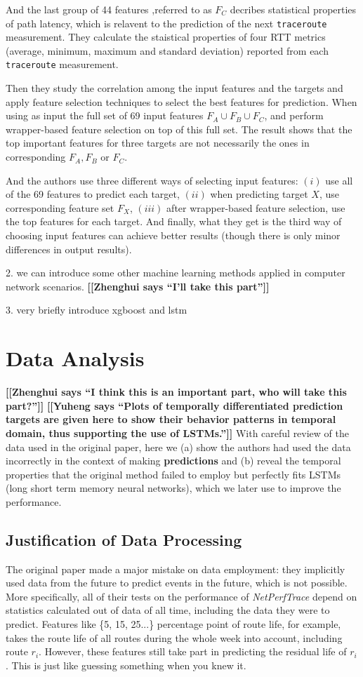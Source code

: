 \documentclass[sigconf]{acmart}
\newcommand{\heng}[1]{{\bf \color{cyan} [[Yuheng says ``#1'']]}}
\newcommand{\hui}[1]{{\bf \color{purple} [[Zhenghui says ``#1'']]}}
\begin{document}
And the last group of 44 features ,referred to as $F_C$ decribes statistical properties of path latency, which is relavent to the prediction of the next \texttt{traceroute} measurement. They calculate the staistical properties of four RTT metrics (average, minimum, maximum and standard deviation) reported from each \texttt{traceroute} measurement.
 

Then they study the correlation among the input features and the targets and apply  feature selection techniques to select the best features for prediction. When using as input the full set of 69 input features $F_A \cup F_B \cup F_C$, and perform wrapper-based feature selection on top of this full set. The result shows that the top important features for three targets are not necessarily the ones in corresponding $F_A,F_B$ or $F_C$.
 

And the authors use three different ways of selecting input features: $(i)$  use all of the 69 features to predict each target, $(ii)$ when predicting target $X$, use corresponding feature set $F_X$, $(iii)$ after wrapper-based feature selection, use the top features for each target. And finally, what they get is the third way of choosing input features can achieve better results (though there is only minor differences in output results).
 

2. we can introduce some other machine learning methods applied in computer network scenarios. \hui{I'll take this part}
 


3. very briefly introduce xgboost and lstm
 

\section{Data Analysis}
\hui{I think this is an important part, who will take this part?}
\heng{Plots of temporally differentiated prediction targets are given here to show their behavior patterns in temporal domain, thus supporting the use of LSTMs.}
With careful review of the data used in the original paper, here we (a) show the authors had used the data incorrectly in the context of making \textbf{predictions} and (b) reveal the temporal properties that the original method failed to employ but perfectly fits LSTMs (long short term memory neural networks), which we later use to improve the performance.

\subsection{Justification of Data Processing}
The original paper \cite{predict} made a major mistake on data employment: they implicitly used data from the future to predict events in the future, which is not possible. More specifically, all of their tests on the performance of \textit{NetPerfTrace} depend on statistics calculated out of data of all time, including the data they were to predict. Features like \{5, 15, 25...\} percentage point of route life, for example, takes the route life of all routes during the whole week into account, including route $r_i$. However, these features still take part in predicting the residual life of $r_i$. This is just like guessing something when you knew it.
\end{document}
